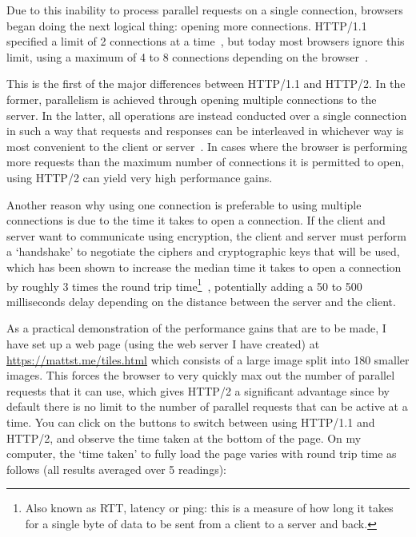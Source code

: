 Due to this inability to process parallel requests on a single connection, browsers began doing the next logical thing: opening more connections. HTTP/1.1 specified a limit of 2 connections at a time~\cite[\S~8.1.4]{h1}, but today most browsers ignore this limit, using a maximum of 4 to 8 connections depending on the browser~\cite{maxconnections}.

This is the first of the major differences between HTTP/1.1 and HTTP/2. In the former, parallelism is achieved through opening multiple connections to the server. In the latter, all operations are instead conducted over a single connection in such a way that requests and responses can be interleaved in whichever way is most convenient to the client or server~\cite[\S~1]{h2}. In cases where the browser is performing more requests than the maximum number of connections it is permitted to open, using HTTP/2 can yield very high performance gains.

Another reason why using one connection is preferable to using multiple connections is due to the time it takes to open a connection. If the client and server want to communicate using encryption, the client and server must perform a `handshake' to negotiate the ciphers and cryptographic keys that will be used, which has been shown to increase the median time it takes to open a connection by roughly 3 times the round trip time\footnote{Also known as RTT, latency or ping: this is a measure of how long it takes for a single byte of data to be sent from a client to a server and back.}~\cite{tlsoverhead}, potentially adding a 50 to 500 milliseconds delay depending on the distance between the server and the client.

As a practical demonstration of the performance gains that are to be made, I have set up a web page (using the web server I have created) at \url{https://mattst.me/tiles.html} which consists of a large image split into 180 smaller images. This forces the browser to very quickly max out the number of parallel requests that it can use, which gives HTTP/2 a significant advantage since by default there is no limit to the number of parallel requests that can be active at a time. You can click on the buttons to switch between using HTTP/1.1 and HTTP/2, and observe the time taken at the bottom of the page. On my computer, the `time taken' to fully load the page varies with round trip time as follows (all results averaged over 5 readings):

